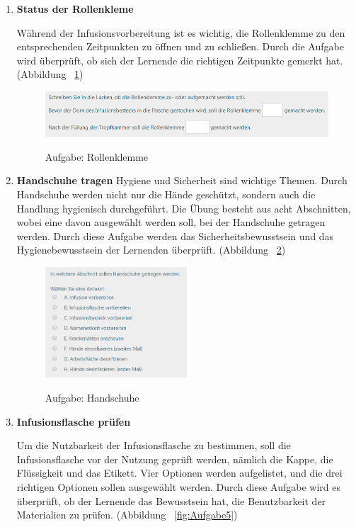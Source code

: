 \begin{enumerate}
    \item \textbf{Status der Rollenkleme}
    
    Während der Infusionsvorbereitung ist es wichtig, die Rollenklemme zu den entsprechenden Zeitpunkten zu öffnen und zu schließen. Durch die Aufgabe wird überprüft, ob sich der Lernende die richtigen Zeitpunkte gemerkt hat. (Abbildung ~\ref{fig:Aufgabe3})
    
\begin{figure}[ht]
\vspace*{1em}
\centering
\caption{Aufgabe: Rollenklemme}
\includegraphics[width= \textwidth]{images/Aufgabe3.png}
\label{fig:Aufgabe3} 
\end{figure}
    
    \item \textbf{Handschuhe tragen}
    Hygiene und Sicherheit sind wichtige Themen. Durch Handschuhe werden nicht nur die Hände geschützt, sondern auch die Handlung hygienisch durchgeführt. Die Übung besteht aus acht Abschnitten, wobei eine davon ausgewählt werden soll, bei der  Handschuhe getragen werden. Durch diese Aufgabe werden das Sicherheitsbewusstsein und das Hygienebewusstsein der Lernenden überprüft. (Abbildung ~\ref{fig:Aufgabe4})
    
\begin{figure}[ht]
\vspace*{1em}
\centering
\caption{Aufgabe: Handschuhe}
\includegraphics[width= 0.5\textwidth]{images/Aufgabe4.png}
\label{fig:Aufgabe4} 
\end{figure}
    
    \item \textbf{Infusionsflasche prüfen}
    
    Um die Nutzbarkeit der Infusionsflasche zu bestimmen, soll die Infusionsflasche vor der Nutzung geprüft werden, nämlich die Kappe, die Flüssigkeit und das Etikett. Vier Optionen werden aufgelistet, und die drei richtigen Optionen sollen ausgewählt werden. Durch diese Aufgabe wird es überprüft, ob der Lernende das Bewusstsein hat, die Benutzbarkeit der Materialien zu prüfen. (Abbildung ~\ref{fig:Aufgabe5})
    

\end{enumerate}
